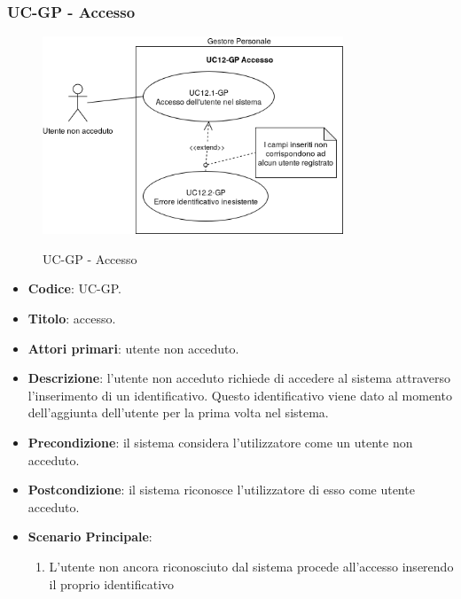 \subsubsection{UC\theuccount-GP - Accesso}
		\begin{figure}[H]
			\centering
				\includegraphics[width=0.8\textwidth]{img/casi_d'uso/UC12.png}\\
			\caption{UC\theuccount-GP - Accesso}
		\end{figure}
	\begin{itemize}
		\item \textbf{Codice}: UC\theuccount-GP.
		\item \textbf{Titolo}: accesso.
		\item \textbf{Attori primari}: utente non acceduto.
		\item \textbf{Descrizione}: l'utente non acceduto richiede di accedere al sistema attraverso l'inserimento di un identificativo.
		Questo identificativo viene dato al momento dell'aggiunta dell'utente per la prima volta nel sistema.
		\item \textbf{Precondizione}: il sistema considera l’utilizzatore come un utente non acceduto.
		\item \textbf{Postcondizione}: il sistema riconosce l'utilizzatore di esso come utente acceduto.
		\item \textbf{Scenario Principale}:
		\begin{enumerate}
			\item L'utente non ancora riconosciuto dal sistema procede all'accesso inserendo il proprio identificativo
		\end{enumerate}
	\end{itemize}
	

